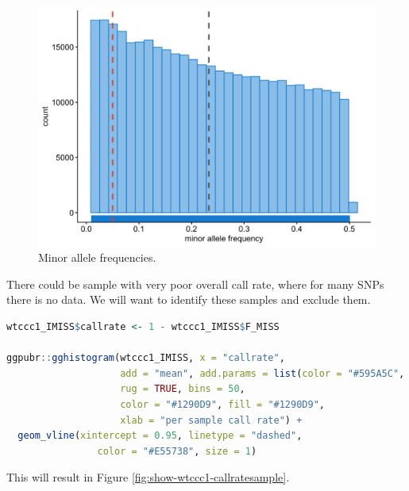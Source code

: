 \documentclass[
]{book}
\begin{document}
\begin{figure}

{\centering \includegraphics[width=18.67in]{img/WTCCC1 FREQ} 

}

\caption{Minor allele frequencies.}\label{fig:show-wtccc1-freq}
\end{figure}

There could be sample with very poor overall call rate, where for many SNPs there is no data. We will want to identify these samples and exclude them.

\begin{lstlisting}[language=R]
wtccc1_IMISS$callrate <- 1 - wtccc1_IMISS$F_MISS

ggpubr::gghistogram(wtccc1_IMISS, x = "callrate",
                    add = "mean", add.params = list(color = "#595A5C", linetype = "dashed", size = 1),
                    rug = TRUE, bins = 50,
                    color = "#1290D9", fill = "#1290D9",
                    xlab = "per sample call rate") +
  geom_vline(xintercept = 0.95, linetype = "dashed",
                color = "#E55738", size = 1)
\end{lstlisting}

This will result in Figure \ref{fig:show-wtccc1-callratesample}.
\end{document}
